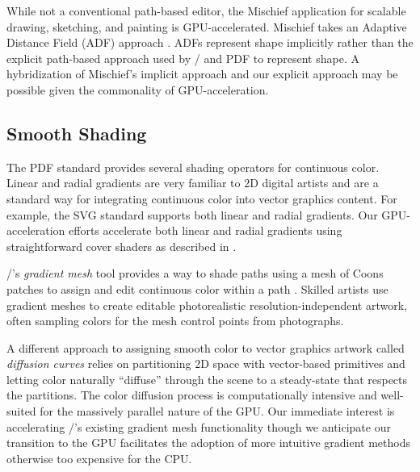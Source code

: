 While not a conventional path-based editor,
the Mischief application \cite{MischiefWebPage} for scalable drawing, sketching, and painting is GPU-accelerated.
Mischief takes an Adaptive Distance Field (ADF) approach
\cite{Frisken:2006:DDF:1185657.1185675}.  ADFs represent shape implicitly
rather than the explicit path-based approach used by \Illustrator/ and PDF
to represent shape. A hybridization of Mischief's implicit approach and our explicit approach may be possible
given the commonality of GPU-acceleration.

\subsection{Smooth Shading} 

The PDF standard provides several shading operators for continuous color. 
Linear and radial gradients are very familiar to 2D digital artists and are a standard way for
integrating continuous color into vector graphics content.  For example, the SVG standard \cite{SVG-Spec} supports
both linear and radial gradients.  Our GPU-acceleration efforts accelerate both linear and radial
gradients using straightforward cover shaders as described in \cite{KilgardBolz2012}.

\Illustrator/'s {\em gradient mesh} tool provides a way to shade paths using
a mesh of Coons patches to assign and edit continuous color within a path \cite{PDF-Spec,CoonsPaper}.
Skilled artists use gradient meshes to create editable photorealistic resolution-independent artwork,
often sampling colors for the mesh control points from photographs.

A different approach to
assigning smooth color to vector graphics artwork called {\em diffusion curves} \cite{Orzan:2013:DCV:2483852.2483873,Sun:2012:DCT:2185520.2185570,Ilbery:2013:BDC:2508363.2508426} relies on
partitioning 2D space with vector-based primitives and letting color naturally ``diffuse'' through the
scene to a steady-state that respects the partitions.  The color diffusion process is computationally intensive and
well-suited for the massively parallel nature of the GPU.  Our immediate interest is accelerating
\Illustrator/'s existing gradient mesh functionality though we anticipate our transition to the GPU
facilitates the adoption of more intuitive gradient methods otherwise too expensive for the CPU.

